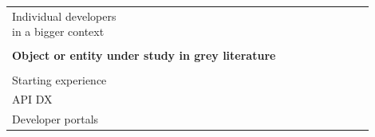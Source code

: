 \documentclass[english, 12pt, a4paper, sci, utf8, a-1b, online]{aaltothesis}
\begin{document}
\begin{center}
\begin{longtable}{p{0.3\linewidth}p{0.6\linewidth}}
    Individual developers in a bigger context  & \textcite{entering-an-ecosystem} \newline \textcite{fagerholm2014examining}                                                                                                                                                                                                                           \\
                                               &                                                                                                                                                                                                                                                                                                       \\
    \multicolumn{2}{l}{\textbf{Object or entity under study in grey literature}}                                                                                                                                                                                                                                                                                                                           \\
    \hline                                                                                                                                                                                                                                                                                                                                             \\
    Starting experience                        & \textcite{what-is-developer-experience-everydeveloper}                                                                                                                                                                                                                                                \\
    API DX                                     & \textcite{great-dx-and-the-people-who-make-them}                                                                                                                                                                                                                                                      \\
    Developer portals                          & \textcite{apis-for-humans-the-rise-of-developer-experience} \newline \textcite{4-apis-doing-developer-experience-really-well} \newline \textcite{what-is-api-developer-experience-and-why-it-matters}                                                                                                 \\

\end{longtable}
\end{center}
\end{document}
